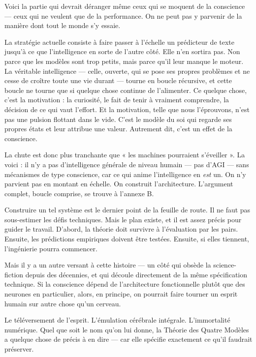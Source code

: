 \documentclass[11pt, twoside, openright]{book}
\begin{document}
Voici la partie qui devrait déranger même ceux qui se moquent de la conscience --- ceux qui ne veulent que de la performance. On ne peut pas y parvenir de la manière dont tout le monde s'y essaie.

La stratégie actuelle consiste à faire passer à l'échelle un prédicteur de texte jusqu'à ce que l'intelligence en sorte de l'autre côté. Elle n'en sortira pas. Non parce que les modèles sont trop petits, mais parce qu'il leur manque le moteur. La véritable intelligence --- celle, ouverte, qui se pose ses propres problèmes et ne cesse de croître toute une vie durant --- tourne en boucle récursive, et cette boucle ne tourne que si quelque chose continue de l'alimenter. Ce quelque chose, c'est la motivation : la curiosité, le fait de tenir à vraiment comprendre, la décision de ce qui vaut l'effort. Et la motivation, telle que nous l'éprouvons, n'est pas une pulsion flottant dans le vide. C'est le modèle du soi qui regarde ses propres états et leur attribue une valeur. Autrement dit, c'est un effet de la conscience.

La chute est donc plus tranchante que « les machines pourraient s'éveiller ». La voici : il n'y a pas d'intelligence générale de niveau humain --- pas d'AGI --- sans mécanismes de type conscience, car ce qui anime l'intelligence en \textit{est} un. On n'y parvient pas en montant en échelle. On construit l'architecture. L'argument complet, boucle comprise, se trouve à l'annexe B.

Construire un tel système est le dernier point de la feuille de route. Il ne faut pas sous-estimer les défis techniques. Mais le plan existe, et il est assez précis pour guider le travail. D'abord, la théorie doit survivre à l'évaluation par les pairs. Ensuite, les prédictions empiriques doivent être testées. Ensuite, si elles tiennent, l'ingénierie pourra commencer.


Mais il y a un autre versant à cette histoire --- un côté qui obsède la science-fiction depuis des décennies, et qui découle directement de la même spécification technique. Si la conscience dépend de l'architecture fonctionnelle plutôt que des neurones en particulier, alors, en principe, on pourrait faire tourner un esprit humain sur autre chose qu'un cerveau.

Le téléversement de l'esprit. L'émulation cérébrale intégrale. L'immortalité numérique. Quel que soit le nom qu'on lui donne, la Théorie des Quatre Modèles a quelque chose de précis à en dire --- car elle spécifie exactement ce qu'il faudrait préserver.
\end{document}
